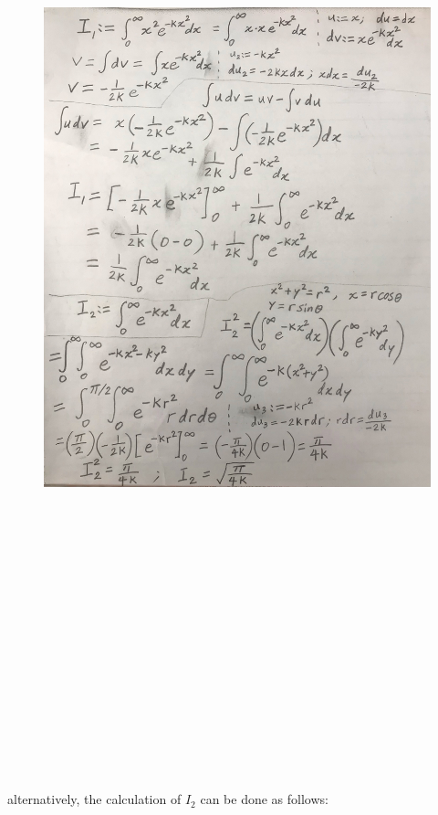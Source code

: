 \documentclass[12pt,border=4pt,multi]{article}%
\begin{document}
\begin{figure}
	\centering
	\includegraphics[width=1.1\textwidth, height=1.4\textwidth]{2.2} %
\end{figure}\\
\\
\\
\\
\\
\\
\\
\\
\\
\\
\\
\\
\\
\\
\\
\\
alternatively, the calculation of $I_2$ can be done as follows:\\
\end{document}
